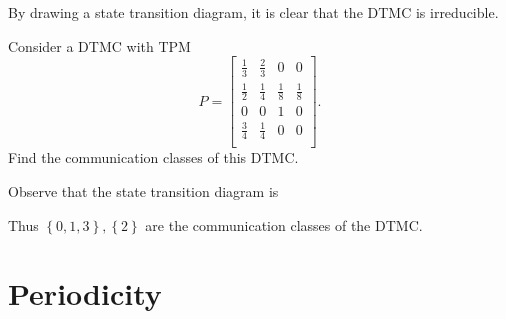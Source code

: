 \documentclass[stat333]{subfiles}
\begin{document}
    \begin{subproof}[Answer]
        By drawing a state transition diagram, it is clear that the DTMC is irreducible.
    \end{subproof}

    \ex Consider a DTMC with TPM
    \begin{equation*}
        P =
        \begin{bmatrix}
        	\frac{1}{3} & \frac{2}{3} & 0 & 0 \\
        	\frac{1}{2} & \frac{1}{4} & \frac{1}{8} & \frac{1}{8} \\
        	0 & 0 & 1 & 0 \\
        	\frac{3}{4} & \frac{1}{4} & 0 & 0 \\
        \end{bmatrix}.
    \end{equation*}
    Find the communication classes of this DTMC.

    \begin{subproof}[Answer]
        Observe that the state transition diagram is
        \begin{center}
        \end{center}
        Thus $\left\lbrace 0,1,3 \right\rbrace, \left\lbrace 2 \right\rbrace$ are the communication classes of the DTMC.
    \end{subproof}

    \clearpage
    \section{Periodicity}
    
\end{document}
